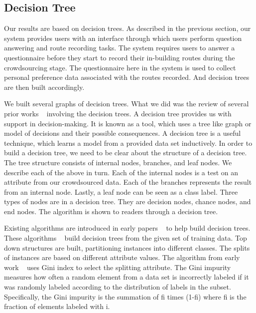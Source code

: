 \documentclass{sigchi}
\begin{document}
\subsection{Decision Tree}

Our results are based on decision trees. As described in the previous section, our system provides users with an interface through which users perform question answering and route recording tasks. The system requires users to answer a questionnaire before they start to record their in-building routes during the crowdsourcing stage. The questionnaire here in the system is used to collect personal preference data associated with the routes recorded. And decision trees are then built accordingly. 


We built several graphs of decision trees. What we did was the review of several prior works ~\cite{su2006fast,quinlan1987simplifying} involving the decision trees. A decision tree provides us with support in decision-making. It is known as a tool, which uses a tree like graph or model of decisions and their possible consequences. A decision tree is a useful technique, which learns a model from a provided data set inductively. In order to build a decision tree, we need to be clear about the structure of a decision tree. The tree structure consists of internal nodes, branches, and leaf nodes. We describe each of the above in turn. Each of the internal nodes is a test on an attribute from our crowdsourced data. Each of the branches represents the result from an internal node. Lastly, a leaf node can be seen as a class label. Three types of nodes are in a decision tree. They are decision nodes, chance nodes, and end nodes. The algorithm is shown to readers through a decision tree. 


Existing algorithms are introduced in early papers ~\cite{breiman1984classification,quinlan1986induction} to help build decision trees. These algorithms ~\cite{breiman1984classification,quinlan1986induction} build decision trees from the given set of training data. Top down structures are built, partitioning instances into different classes. The splits of instances are based on different attribute values. The algorithm from early work ~\cite{breiman1984classification} uses Gini index to select the splitting attribute. The Gini impurity measures how often a random element from a data set is incorrectly labeled if it was randomly labeled according to the distribution of labels in the subset. Specifically, the Gini impurity is the summation of fi times (1-fi) where fi is the fraction of elements labeled with i.
\end{document}
